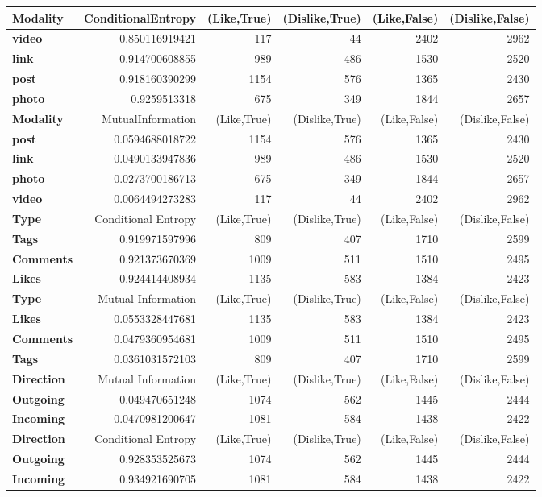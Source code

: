 \cleardoublepage
\begin{table}
	\centering
	\begin{tabular}{| >{\small}l | >{\small}r | >{\small}r | >{\small}r | >{\small}r | >{\small}r |}
		\hline
		Modality & ConditionalEntropy & (Like,True) & (Dislike,True) & (Like,False) & (Dislike,False)\\
		\hline
		\textbf{video} & 0.850116919421 & 117 & 44 & 2402 & 2962\\
		\hline
		\textbf{link} & 0.914700608855 & 989 & 486 & 1530 & 2520\\
		\hline
		\textbf{post} & 0.918160390299 & 1154 & 576 & 1365 & 2430\\
		\hline
		\textbf{photo} & 0.9259513318 & 675 & 349 & 1844 & 2657\\
		\hline
		\hline
		\textbf{Modality} & MutualInformation & (Like,True) & (Dislike,True) & (Like,False) & (Dislike,False)\\
		\hline
		\textbf{post} & 0.0594688018722 & 1154 & 576 & 1365 & 2430\\
		\hline
		\textbf{link} & 0.0490133947836 & 989 & 486 & 1530 & 2520\\
		\hline
		\textbf{photo} & 0.0273700186713 & 675 & 349 & 1844 & 2657\\
		\hline
		\textbf{video} & 0.0064494273283 & 117 & 44 & 2402 & 2962\\
		\hline
		\hline
		\textbf{Type}  & Conditional Entropy & (Like,True) & (Dislike,True) & (Like,False) & (Dislike,False)\\
		\hline
		\textbf{Tags}  &  0.919971597996 & 809 & 407 & 1710 & 2599\\
		\hline
		\textbf{Comments}  &  0.921373670369 & 1009 & 511 & 1510 & 2495\\
		\hline
		\textbf{Likes}  &  0.924414408934 & 1135 & 583 & 1384 & 2423\\
		\hline
		\hline
		\textbf{Type}  & Mutual Information & (Like,True) & (Dislike,True) & (Like,False) & (Dislike,False)\\
		\hline
		\textbf{Likes}  &  0.0553328447681 & 1135 & 583 & 1384 & 2423\\
		\hline
		\textbf{Comments}  &  0.0479360954681 & 1009 & 511 & 1510 & 2495\\
		\hline
		\textbf{Tags}  &  0.0361031572103 & 809 & 407 & 1710 & 2599\\
		\hline
		\hline
		\textbf{Direction} & Mutual Information & (Like,True) & (Dislike,True) & (Like,False) & (Dislike,False)\\
		\hline
		\textbf{Outgoing}  &  0.049470651248 & 1074 & 562 & 1445 & 2444\\
		\hline
		\textbf{Incoming}  &  0.0470981200647 & 1081 & 584 & 1438 & 2422\\
		\hline
		\hline
		\textbf{Direction} & Conditional Entropy &  (Like,True) & (Dislike,True) & (Like,False) & (Dislike,False)\\
		\hline
		\textbf{Outgoing}  &  0.928353525673 & 1074 & 562 & 1445 & 2444\\
		\hline
		\textbf{Incoming}  &  0.934921690705 & 1081 & 584 & 1438 & 2422\\
		\hline
		

\end{tabular}
\end{table}
